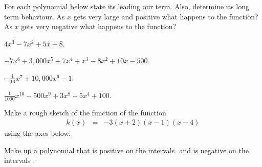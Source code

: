 \begin{problem}
\item For each polynomial below state its leading our term.  Also,
  determine its long term behaviour. As $x$ gets very large and
  positive what happens to the function? As $x$ gets very negative
  what happens to the function?
  \begin{subproblem}
  \item ${\displaystyle 4x^3 - 7x^2 + 5x + 8 }$.
    \vfill
  \item ${\displaystyle -7 x^6 + 3,000 x^5 + 7x^4 + x^3 - 8x^2 + 10x - 500}$.
    \vfill
  \item ${\displaystyle - \frac{1}{10} x^7 + 10,000 x^6 - 1 }$.
    \vfill
  \item ${\displaystyle \frac{1}{1000} x^{10} - 500 x^9 + 3 x^8 - 5 x^4 + 100 }$.
    \vfill
  \end{subproblem}

  \clearpage

\item Make a rough sketch of the function of the function
  \begin{eqnarray*}
    k(x) & = & -3(x+2)(x-1)(x-4)
  \end{eqnarray*}
  using the axes below.


  \vfill

  \clearpage
  
  \item Make up a polynomial that is positive on the intervals $ $ and
    is negative on the intervals $ $.


\end{problem}
